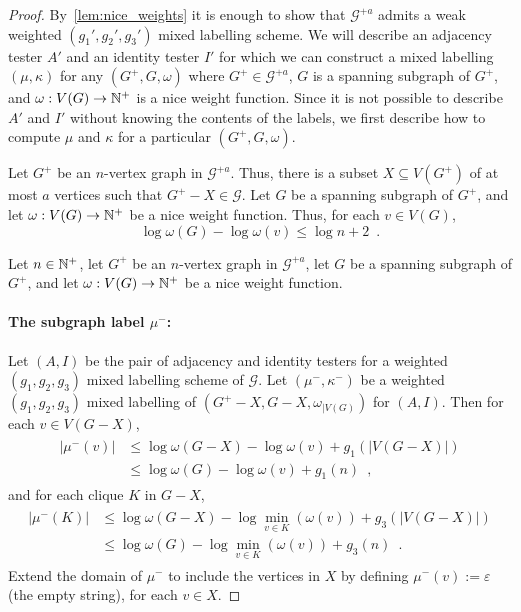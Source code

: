 \documentclass{patmorin}
\renewcommand{\le}{\leqslant}
\begin{document}
\begin{proof}
  By~\cref{lem:nice_weights} it is enough to show that $\mathcal{G}^{+a}$ admits a weak weighted $(g_1',g_2',g_3')$ mixed labelling scheme. We will describe an adjacency tester $A'$ and an identity tester $I'$ for which we can construct a mixed labelling $(\mu,\kappa)$ for any $(G^+,G,\omega)$ where $G^+\in \mathcal{G}^{+a}$, $G$ is a spanning subgraph of $G^+$, and $\omega:V(G)\to\mathbb{N}^+$ is a nice weight function.
  Since it is not possible to describe $A'$ and $I'$ without knowing the contents of the labels, we first describe how to compute $\mu$ and $\kappa$ for a particular $(G^+,G,\omega)$.

  Let $G^+$ be an $n$-vertex graph in $\mathcal{G}^{+a}$.  Thus, there is a subset $X\subseteq V(G^+)$ of at most $a$ vertices such that $G^+-X\in\mathcal{G}$.  Let $G$ be a spanning subgraph of $G^+$, and let $\omega:V(G)\to\mathbb{N}^+$ be a nice weight function.
  Thus, for each $v\in V(G)$,
  \begin{equation}
    \log\omega(G)-\log\omega(v)\le\log n + 2\enspace.
  \end{equation}

  Let $n\in \mathbb{N}^+$,
  let $G^+$ be an $n$-vertex graph in $\mathcal{G}^{+a}$,    let $G$ be a spanning subgraph of $G^+$,    and
  let $\omega:V(G)\to\mathbb{N}^+$ be a nice weight function.

  \paragraph{\boldmath The subgraph label $\mu^-$:}
  Let $(A,I)$ be the pair of adjacency and identity testers for a weighted $(g_1,g_2,g_3)$ mixed labelling scheme of $\mathcal{G}$.
  Let $(\mu^-,\kappa^-)$ be a weighted $(g_1,g_2,g_3)$ mixed labelling of $(G^+-X, G-X,\omega_{|V(G)})$ for $(A,I)$.
  Then for each $v\in V(G-X)$,
  \begin{align}
    \begin{split}
      |\mu^-(v)|
       & \le \log\omega(G-X) -\log\omega(v)+g_1(|V(G-X)|) \\
       & \le \log\omega(G)-\log\omega(v)+g_1(n) \enspace,
    \end{split}
    \label{eq:mu-}
  \end{align}
  and for each clique $K$ in $G-X$,
  \begin{align}
    \label{eq:split}
    \begin{split}
      |\mu^-(K)|
       & \le \log\omega(G-X)-\log\min_{v\in K}(\omega(v))+g_3(|V(G-X)|)  \\
       & \le \log\omega(G)-\log\min_{v\in K}(\omega(v))+g_3(n) \enspace.
    \end{split}
  \end{align}
  Extend the domain of $\mu^-$ to include the vertices in $X$ by defining $\mu^-(v):=\varepsilon$ (the empty string), for each $v\in X$.


\end{proof}
\end{document}
